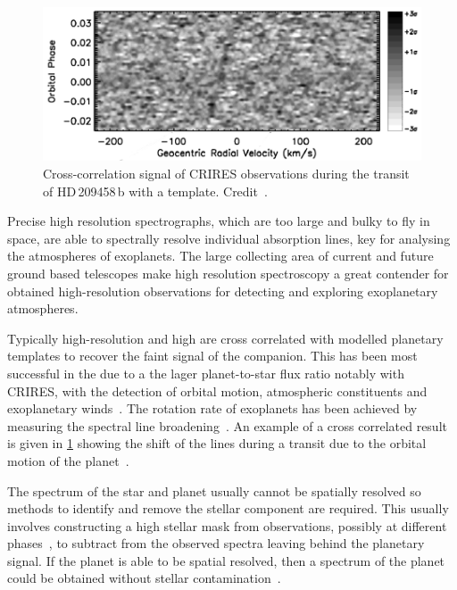 \begin{figure}
    \centering
    \includegraphics[width=0.7\linewidth]{figures/introduction/snellen2010}
    \caption[Cross-correlation signal from {CRIRES} observations of HD\,209458\,b.]{Cross-correlation signal of {CRIRES} observations during the transit of HD\,209458\,b with a  template.
        Credit~\citet{snellen_orbital_2010}.}
    \label{fig:snellen2010}
\end{figure}

Precise high resolution spectrographs, which are too large and bulky to fly in space, are able to spectrally resolve individual absorption lines, key for analysing the atmospheres of exoplanets.
The large collecting area of current and future ground based telescopes make high resolution spectroscopy a great contender for obtained high-resolution observations for detecting and exploring exoplanetary atmospheres.

Typically high-resolution and high \snr{} are cross correlated with modelled planetary templates to recover the faint signal of the companion.
This has been most successful in the \nir{} due to a the lager planet-to-star flux ratio
notably with CRIRES, with the detection of orbital motion, atmospheric constituents and exoplanetary winds~\citep[e.g.][]{snellen_orbital_2010, dekok_detection_2013, brogi_carbon_2014, brogi_rotation_2016, schwarz_evidence_2015}.
The rotation rate of exoplanets has been achieved by measuring the spectral line broadening~\citep{snellen_fast_2014, brogi_rotation_2016}.
An example of a cross correlated result is given in \cref{fig:snellen2010} showing the shift of the  lines during a transit due to the orbital motion of the planet~\citep{snellen_orbital_2010}.

The spectrum of the star and planet usually cannot be spatially resolved so methods to identify and remove the stellar component are required.
This usually involves constructing a high \snr{} stellar mask from observations, possibly at different phases~\citep[e.g.][]{rodler_weighing_2012}, to subtract from the observed spectra leaving behind the planetary signal.
If the planet is able to be spatial resolved, then a spectrum of the planet could be obtained without stellar contamination~\citep[e.g.][]{snellen_combining_2015}.

